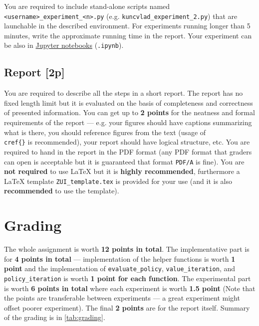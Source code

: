 \documentclass[10pt,journal,compsoc,twoside]{IEEEtran}
\begin{document}
You are required to include stand-alone scripts named \texttt{<username>\_experiment\_<n>.py} (e.g. \texttt{kuncvlad\_experiment\_2.py}) that are launchable in the described environment. For experiments running longer than 5 minutes, write the approximate running time in the report. Your experiment can be also in \href{http://jupyter.org/}{Jupyter notebooks} (\texttt{.ipynb}).


\subsection{Report [2p]}
You are required to describe all the steps in a short report. The report has no fixed length limit but it is evaluated on the basis of completeness and correctness of presented information. You can get up to \textbf{2 points} for the neatness and formal requirements of the report --- e.g. your figures should have captions summarizing what is there, you should reference figures from the text (usage of \texttt{\\cref\{\}} is recommended), your report should have logical structure, etc. You are required to hand in the report in the PDF format (any PDF format that graders can open is acceptable but it is guaranteed that format \texttt{PDF/A} is fine). You are \textbf{not required} to use \LaTeX{}  but it is \textbf{highly recommended}, furthermore a \LaTeX{} template \texttt{ZUI\_template.tex} is provided for your use (and it is also \textbf{recommended} to use the template).

\section{Grading}
The whole assignment is worth \textbf{12 points in total}. The implementative part is for \textbf{4 points in total} --- implementation of the helper functions is worth \textbf{1 point} and the implementation of \lstinline{evaluate_policy}, \lstinline{value_iteration}, and \lstinline{policy_iteration} is worth \textbf{1 point for each function}. The experimental part is worth \textbf{6 points in total} where each experiment is worth \textbf{1.5 point} (Note that the points are transferable between experiments --- a great experiment might offset poorer experiment). The final \textbf{2 points} are for the report itself. Summary of the grading is in \cref{tab:grading}.
\end{document}
